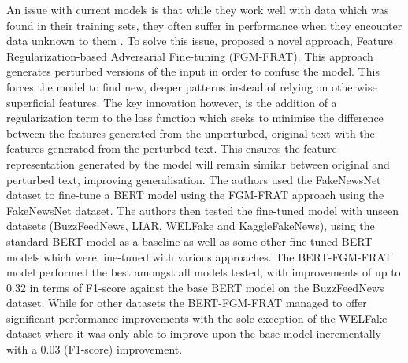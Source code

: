 \documentclass[stu,12pt,floatsintext,donotrepeattitle]{apa7}
\begin{document}
An issue with current models is that while they work well with data which was found in their training sets, they often suffer in performance when they encounter data unknown to them \parencite{BERT-finetuning}. To solve this issue, \textcite{BERT-finetuning} proposed a novel approach, Feature Regularization-based Adversarial Fine-tuning (FGM-FRAT). This approach generates perturbed versions of the input in order to confuse the model. This forces the model to find new, deeper patterns instead of relying on otherwise superficial features. The key innovation however, is the addition of a regularization term to the loss function which seeks to minimise the difference between the features generated from the unperturbed, original text with the features generated from the perturbed text. This ensures the feature representation generated by the model will remain similar between original and perturbed text, improving generalisation. The authors used the FakeNewsNet dataset to fine-tune a BERT model using the FGM-FRAT approach using the FakeNewsNet dataset. The authors then tested the fine-tuned model with unseen datasets (BuzzFeedNews, LIAR, WELFake and KaggleFakeNews), using the standard BERT model as a baseline as well as some other fine-tuned BERT models which were fine-tuned with various approaches. The BERT-FGM-FRAT model performed the best amongst all models tested, with improvements of up to 0.32 in terms of F1-score against the base BERT model on the BuzzFeedNews dataset. While for other datasets the BERT-FGM-FRAT managed to offer significant performance improvements with the sole exception of the WELFake dataset where it was only able to improve upon the base model incrementally with a 0.03 (F1-score) improvement. 
\end{document}
